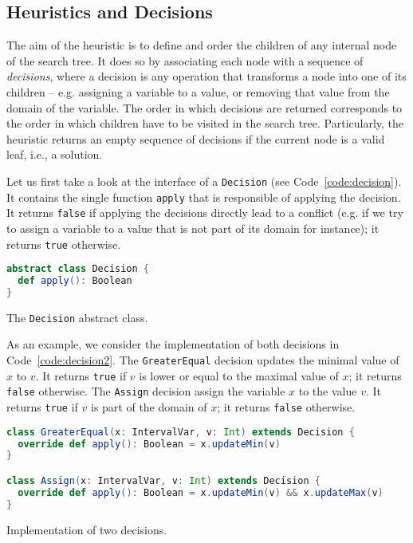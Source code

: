 \documentclass{llncs}
\begin{document}
\subsection{Heuristics and Decisions}

The aim of the heuristic is to define and order the children of any internal node of the search tree. 
It does so by associating each node with a sequence of \emph{decisions}, where a decision is any operation that transforms a node into one of its children -- e.g. assigning a variable to a value, or removing that value from the domain of the variable.
The order in which decisions are returned corresponds to the order in which children have to be visited in the search tree.
Particularly, the heuristic returns an empty sequence of decisions if the current node is a valid leaf, i.e., a solution.

Let us first take a look at the interface of a \texttt{Decision} (see Code~\ref{code:decision}). It contains the single function \texttt{apply} that is responsible of applying the decision. It returns \texttt{false} if applying the decisions directly lead to a conflict (e.g. if we try to assign a variable to a value that is not part of its domain for instance); it returns \texttt{true} otherwise. 

\begin{code}
\begin{lstlisting}[language=scala, style=lineNumber]
abstract class Decision {
  def apply(): Boolean
}
\end{lstlisting}
\caption{The \texttt{Decision} abstract class.}
\label{code:decision}
\end{code}

\noindent
As an example, we consider the implementation of both decisions in Code~\ref{code:decision2}.
The \texttt{GreaterEqual} decision updates the minimal value of $x$ to $v$. It returns \texttt{true} if $v$ is lower or equal to the maximal value of $x$; it returns \texttt{false} otherwise. 
The \texttt{Assign} decision assign the variable $x$ to the value $v$. 
It returns \texttt{true} if $v$ is part of the domain of $x$; it returns \texttt{false} otherwise. 

\begin{code}
\begin{lstlisting}[language=scala, style=lineNumber]
class GreaterEqual(x: IntervalVar, v: Int) extends Decision {
  override def apply(): Boolean = x.updateMin(v)
}

class Assign(x: IntervalVar, v: Int) extends Decision {
  override def apply(): Boolean = x.updateMin(v) && x.updateMax(v) 
}
\end{lstlisting}
\caption{Implementation of two decisions.}
\label{code:decision2}
\end{code}
\end{document}
